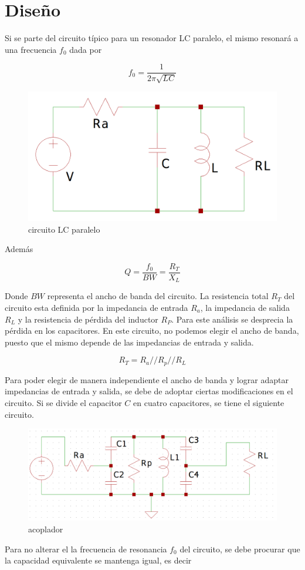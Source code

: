 \section{Diseño}
Si se parte del circuito típico para un resonador LC paralelo, el mismo resonará a una frecuencia $f_0$ dada por

$$
f_0 = \frac{1}{2\pi\sqrt{LC}}
$$

\begin{figure}[H]
    \centering
    \includegraphics[width=0.5\linewidth]{fig/lcparalelo.png}
    \caption{circuito LC paralelo}
    \label{fig:enter-label}
\end{figure}

Además

$$
Q = \frac{f_0}{BW} = \frac{R_T}{X_L}   
$$

Donde $BW$ representa el ancho de banda del circuito. La resistencia total $R_T$ del circuito esta definida por la impedancia de entrada $R_a$, la impedancia de salida $R_L$ y la resistencia de pérdida del inductor $R_P$. Para este análisis se desprecia la pérdida en los capacitores. En este circuito, no podemos elegir el ancho de banda, puesto que el mismo depende de las impedancias de entrada y salida.

$$
R_T = R_a//R_p//R_L
$$

Para poder elegir de manera independiente el ancho de banda y lograr adaptar impedancias de entrada y salida, se debe de adoptar ciertas modificaciones en el circuito. Si se divide el capacitor $C$ en cuatro capacitores, se tiene el siguiente circuito.

\begin{figure}[H]
    \centering
    \includegraphics[width=0.5\linewidth]{fig/circuito.png}
    \caption{acoplador}
    \label{fig:enter-label}
\end{figure}

Para no alterar el la frecuencia de resonancia $f_0$ del circuito, se debe procurar que la capacidad equivalente se mantenga igual, es decir

